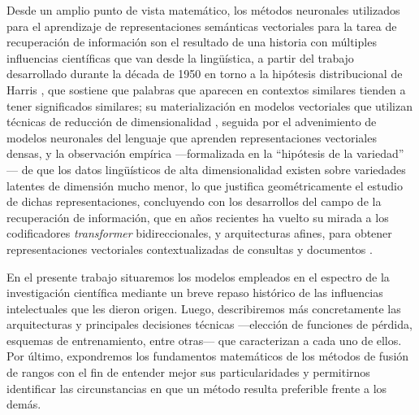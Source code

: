 \documentclass[12pt]{article}
\begin{document}
	Desde un amplio punto de vista matemático, los métodos neuronales utilizados para el aprendizaje de representaciones semánticas vectoriales para la tarea de recuperación de información son el resultado de una historia con múltiples influencias científicas que van desde la lingüística, a partir del trabajo desarrollado durante la década de 1950 en torno a la hipótesis distribucional de Harris \parencite{harris1954distributional}, que sostiene que palabras que aparecen en contextos similares tienden a tener significados similares; su materialización en modelos vectoriales que utilizan técnicas de reducción de dimensionalidad \parencite{deerwester1990indexing, lund1997modelling}, seguida por el advenimiento de modelos neuronales del lenguaje que aprenden representaciones vectoriales densas, y la observación empírica ---formalizada en la ``hipótesis de la variedad'' \parencite{whiteley2026statistical, fefferman2016testing}--- de que los datos lingüísticos de alta dimensionalidad existen sobre variedades latentes de dimensión mucho menor, lo que justifica geométricamente el estudio de dichas representaciones, concluyendo con los desarrollos del campo de la recuperación de información, que en años recientes ha vuelto su mirada a los codificadores \textit{transformer} bidireccionales, y arquitecturas afines, para obtener representaciones vectoriales contextualizadas de consultas y documentos \parencite{karpukhin2020dense, nogueira2019passage}.
	
	En el presente trabajo situaremos los modelos empleados en el espectro de la investigación científica mediante un breve repaso histórico de las influencias intelectuales que les dieron origen. Luego, describiremos más concretamente las arquitecturas y principales decisiones técnicas ---elección de funciones de pérdida, esquemas de entrenamiento, entre otras--- que caracterizan a cada uno de ellos. Por último, expondremos los fundamentos matemáticos de los métodos de fusión de rangos con el fin de entender mejor sus particularidades y permitirnos identificar las circunstancias en que un método resulta preferible frente a los demás.
	
\end{document}
